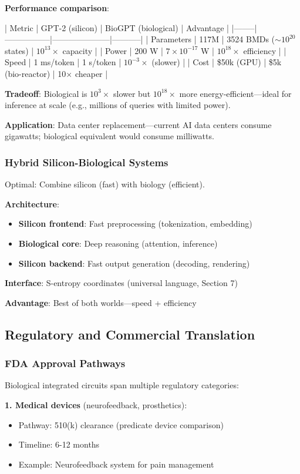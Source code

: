 \documentclass[11pt,a4paper]{article}
\begin{document}
\textbf{Performance comparison}:

| Metric | GPT-2 (silicon) | BioGPT (biological) | Advantage |
|--------|-----------------|---------------------|-----------|
| Parameters | 117M | 3524 BMDs ($\sim 10^{20}$ states) | $10^{13}\times$ capacity |
| Power | 200 W | $7 \times 10^{-17}$ W | $10^{18}\times$ efficiency |
| Speed | 1 ms/token | 1 s/token | $10^{-3}\times$ (slower) |
| Cost | \$50k (GPU) | \$5k (bio-reactor) | 10$\times$ cheaper |

\textbf{Tradeoff}: Biological is $10^3\times$ slower but $10^{18}\times$ more energy-efficient—ideal for inference at scale (e.g., millions of queries with limited power).

\textbf{Application}: Data center replacement—current AI data centers consume gigawatts; biological equivalent would consume milliwatts.

\subsubsection{Hybrid Silicon-Biological Systems}

Optimal: Combine silicon (fast) with biology (efficient).

\textbf{Architecture}:
\begin{itemize}
\item \textbf{Silicon frontend}: Fast preprocessing (tokenization, embedding)
\item \textbf{Biological core}: Deep reasoning (attention, inference)
\item \textbf{Silicon backend}: Fast output generation (decoding, rendering)
\end{itemize}

\textbf{Interface}: S-entropy coordinates (universal language, Section 7)

\textbf{Advantage}: Best of both worlds—speed + efficiency

\subsection{Regulatory and Commercial Translation}

\subsubsection{FDA Approval Pathways}

Biological integrated circuits span multiple regulatory categories:

\textbf{1. Medical devices} (neurofeedback, prosthetics):
\begin{itemize}
\item Pathway: 510(k) clearance (predicate device comparison)
\item Timeline: 6-12 months
\item Example: Neurofeedback system for pain management
\end{itemize}
\end{document}
